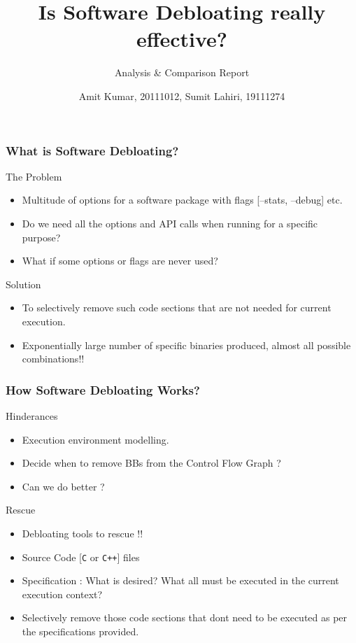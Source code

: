 \documentclass[9pt]{beamer}
\title[CS639A Software Debloating Techniques : Course Project Presentation] %
{Is Software Debloating really effective?}
\author[Amit Kumar, Sumit Lahiri] %
{Amit Kumar, 20111012\inst{1}, Sumit Lahiri, 19111274\inst{1}}
\institute[IIT Kanpur] %
{
	\inst{1}%
	Computer Science \& Engineering Dept.\\
	Indian Institute Of Technology, Kanpur
}
\subtitle{Analysis \& Comparison Report}
\date[August 2019 - April 2024] %
\begin{document}
\frame{\titlepage}

\begin{frame}
	\frametitle{What is Software Debloating?}
	\begin{block}{The Problem}
		\begin{itemize}
			\pause
			\item Multitude of options for a software package with flags [--stats, --debug] etc.
			\pause
			\item Do we need all the options and API calls when running for a specific purpose?
			\pause
			\item What if some options or flags are never used?
		\end{itemize}
	\end{block}
	\pause
	\begin{block}{Solution}
	\begin{itemize}
		\pause
		\item To selectively remove such code sections that are not needed for current execution.
		\pause
		\item Exponentially large number of specific binaries produced, almost all possible combinations!!
	\end{itemize}
	\end{block}
\end{frame}
\begin{frame}
	\frametitle{How Software Debloating Works?}
	\pause
	\begin{block}{Hinderances}
		\begin{itemize}
			\pause
			\item  Execution environment modelling.
			\pause
			\item Decide when to remove BBs from the Control Flow Graph ?
			\pause
			\item Can we do better ?
			\pause
		\end{itemize}
	\end{block}
	\begin{block}{Rescue}
		\begin{itemize}
			\pause
			\item Debloating tools to rescue !! 
			\pause
			\item Source Code [\texttt{C} or \texttt{C++}] files
			\pause
			\item Specification : What is desired? What all must be executed in the current execution context?
			\pause
			\item Selectively remove those code sections that dont need to be executed as per the specifications provided.
		\end{itemize}
	\end{block}
\end{frame}
\end{document}
